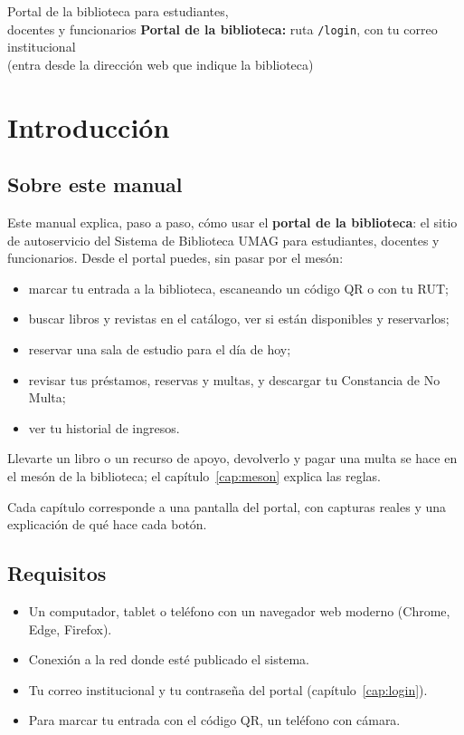 \documentclass[11pt,a4paper]{report}
\begin{document}
\portadamanual
  {Portal de la biblioteca para estudiantes,\\docentes y funcionarios}
  {\textbf{Portal de la biblioteca:} ruta \texttt{/login}, con tu correo institucional\\[6pt]
   {\small (entra desde la dirección web que indique la biblioteca)}}

\tableofcontents
\clearpage

\chapter{Introducción}

\section{Sobre este manual}

Este manual explica, paso a paso, cómo usar el \textbf{portal de la
biblioteca}: el sitio de autoservicio del Sistema de Biblioteca UMAG para
estudiantes, docentes y funcionarios. Desde el portal puedes, sin pasar por
el mesón:

\begin{itemize}
  \item marcar tu entrada a la biblioteca, escaneando un código QR o con tu
  RUT;
  \item buscar libros y revistas en el catálogo, ver si están disponibles y
  reservarlos;
  \item reservar una sala de estudio para el día de hoy;
  \item revisar tus préstamos, reservas y multas, y descargar tu Constancia
  de No Multa;
  \item ver tu historial de ingresos.
\end{itemize}

Llevarte un libro o un recurso de apoyo, devolverlo y pagar una multa se
hace en el mesón de la biblioteca; el capítulo~\ref{cap:meson} explica las
reglas.

Cada capítulo corresponde a una pantalla del portal, con capturas reales y
una explicación de qué hace cada botón.

\section{Requisitos}

\begin{itemize}
  \item Un computador, tablet o teléfono con un navegador web moderno
  (Chrome, Edge, Firefox).
  \item Conexión a la red donde esté publicado el sistema.
  \item Tu correo institucional y tu contraseña del portal
  (capítulo~\ref{cap:login}).
  \item Para marcar tu entrada con el código QR, un teléfono con cámara.
\end{itemize}
\end{document}
